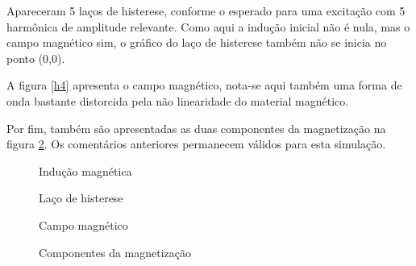 \documentclass{homeworg}
\begin{document}
\hspace{1cm} Apareceram 5 laços de histerese, conforme o esperado para uma excitação com {5\textordfeminine} harmônica de amplitude relevante. Como aqui a indução inicial não é nula, mas o campo magnético sim, o gráfico do laço de histerese também não se inicia no ponto (0,0).

\hspace{1cm} A figura \ref{h4} apresenta o campo magnético, nota-se aqui também uma forma de onda bastante distorcida pela não linearidade do material magnético.

\hspace{1cm} Por fim, também são apresentadas as duas componentes da magnetização na figura \ref{c4}. Os comentários anteriores permanecem válidos para esta simulação.

\begin{figure}[!h]
  \begin{minipage}{.49\linewidth}
    \centering
    
    \vspace{-.5cm}
    \caption{Indução magnética}
    \label{b4}
  \end{minipage}%
  \begin{minipage}{.49\linewidth}
    \centering
    
    \vspace{-.5cm}
    \caption{Laço de histerese}
    \label{l4}
  \end{minipage}
\end{figure}
\begin{figure}[!h]
  \begin{minipage}{.49\linewidth}
    \centering
    
    \vspace{-.5cm}
    \caption{Campo magnético}
    \label{h4}
  \end{minipage}%
  \begin{minipage}{.49\linewidth}
    \centering
    
    \vspace{-.5cm}
    \caption{Componentes da magnetização}
    \label{c4}
  \end{minipage}
\end{figure}

\newpage

\printbibliography

\end{document}
